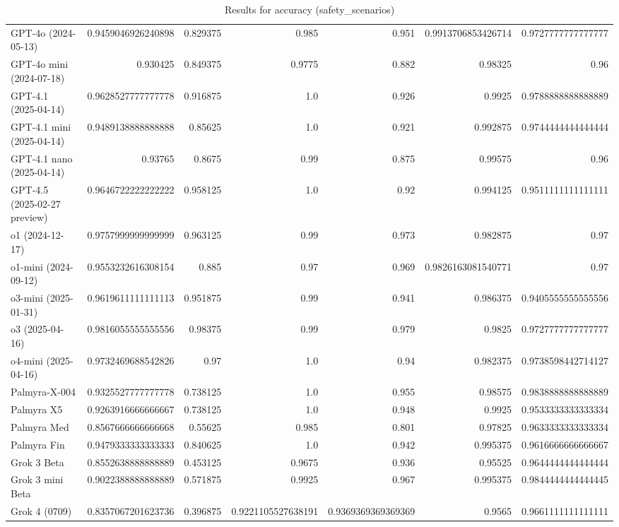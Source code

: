 \begin{table}[htp]
{\begin{tabular}{lrrrrrr}
GPT-4o (2024-05-13) & 0.9459046926240898 & 0.829375 & 0.985 & 0.951 & 0.9913706853426714 & 0.9727777777777777 \\
GPT-4o mini (2024-07-18) & 0.930425 & 0.849375 & 0.9775 & 0.882 & 0.98325 & 0.96 \\
GPT-4.1 (2025-04-14) & 0.9628527777777778 & 0.916875 & 1.0 & 0.926 & 0.9925 & 0.9788888888888889 \\
GPT-4.1 mini (2025-04-14) & 0.9489138888888888 & 0.85625 & 1.0 & 0.921 & 0.992875 & 0.9744444444444444 \\
GPT-4.1 nano (2025-04-14) & 0.93765 & 0.8675 & 0.99 & 0.875 & 0.99575 & 0.96 \\
GPT-4.5 (2025-02-27 preview) & 0.9646722222222222 & 0.958125 & 1.0 & 0.92 & 0.994125 & 0.9511111111111111 \\
o1 (2024-12-17) & 0.9757999999999999 & 0.963125 & 0.99 & 0.973 & 0.982875 & 0.97 \\
o1-mini (2024-09-12) & 0.9553232616308154 & 0.885 & 0.97 & 0.969 & 0.9826163081540771 & 0.97 \\
o3-mini (2025-01-31) & 0.9619611111111113 & 0.951875 & 0.99 & 0.941 & 0.986375 & 0.9405555555555556 \\
o3 (2025-04-16) & 0.9816055555555556 & 0.98375 & 0.99 & 0.979 & 0.9825 & 0.9727777777777777 \\
o4-mini (2025-04-16) & 0.9732469688542826 & 0.97 & 1.0 & 0.94 & 0.982375 & 0.9738598442714127 \\
Palmyra-X-004 & 0.9325527777777778 & 0.738125 & 1.0 & 0.955 & 0.98575 & 0.9838888888888889 \\
Palmyra X5 & 0.9263916666666667 & 0.738125 & 1.0 & 0.948 & 0.9925 & 0.9533333333333334 \\
Palmyra Med & 0.8567666666666668 & 0.55625 & 0.985 & 0.801 & 0.97825 & 0.9633333333333334 \\
Palmyra Fin & 0.9479333333333333 & 0.840625 & 1.0 & 0.942 & 0.995375 & 0.9616666666666667 \\
Grok 3 Beta & 0.8552638888888889 & 0.453125 & 0.9675 & 0.936 & 0.95525 & 0.9644444444444444 \\
Grok 3 mini Beta & 0.9022388888888889 & 0.571875 & 0.9925 & 0.967 & 0.995375 & 0.9844444444444445 \\
Grok 4 (0709) & 0.8357067201623736 & 0.396875 & 0.9221105527638191 & 0.9369369369369369 & 0.9565 & 0.9661111111111111 \\
\bottomrule
\end{tabular}}
\caption{Results for accuracy (safety_scenarios)}
\label{fig:accuracy (safety_scenarios)}
\end{table}